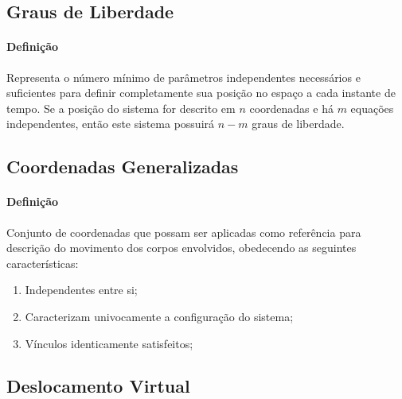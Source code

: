 \documentclass{article}
\begin{document}
        \subsection{Graus de Liberdade}
            \paragraph{Definição}Representa o número mínimo de parâmetros independentes necessários e suficientes para definir completamente sua posição no espaço a cada instante de tempo. Se a posição do sistema for descrito em $n$ coordenadas e há $m$ equações independentes, então este sistema possuirá $n-m$ graus de liberdade.

        \subsection{Coordenadas Generalizadas}
            \paragraph{Definição}Conjunto de coordenadas que possam ser aplicadas como referência para descrição do movimento dos corpos envolvidos, obedecendo as seguintes características:
                \begin{enumerate}[noitemsep]
                    \item Independentes entre si;
                    \item Caracterizam univocamente a configuração do sistema;
                    \item Vínculos identicamente satisfeitos;
                \end{enumerate}

        \subsection{Deslocamento Virtual}
\end{document}
